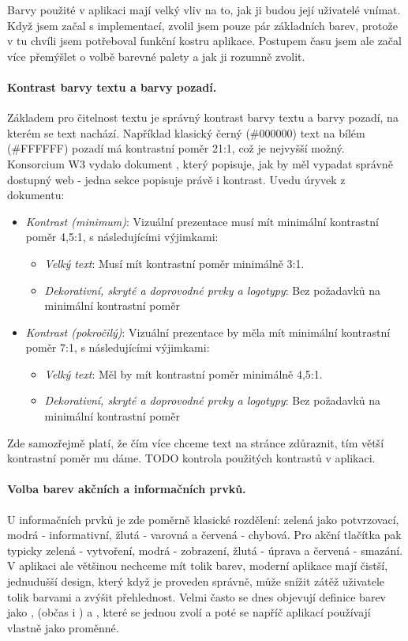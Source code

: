Barvy použité v aplikaci mají velký vliv na to, jak ji budou její uživatelé vnímat. Když jsem začal s implementací, zvolil jsem pouze pár základních barev, protože v tu chvíli jsem potřeboval funkční kostru aplikace. Postupem času jsem ale začal více přemýšlet o volbě barevné palety a jak ji rozumně zvolit.

\paragraph{Kontrast barvy textu a barvy pozadí.} Základem pro čitelnost textu je správný kontrast barvy textu a barvy pozadí, na kterém se text nachází. Například klasický černý (\#000000) text na bílém (\#FFFFFF) pozadí má kontrastní poměr 21:1, což je nejvyšší možný. Konsorcium W3 vydalo dokument \cite{w3-access-guide}, který popisuje, jak by měl vypadat správně dostupný web - jedna sekce popisuje právě i kontrast. Uvedu úryvek z dokumentu:
\begin{itemize}
    \item \emph{Kontrast (minimum)}: Vizuální prezentace musí mít minimální kontrastní poměr 4,5:1, s následujícími výjimkami:
    \begin{itemize}
        \item \emph{Velký text}: Musí mít kontrastní poměr minimálně 3:1.
        \item \emph{Dekorativní, skryté a doprovodné prvky a logotypy}: Bez požadavků na minimální kontrastní poměr
    \end{itemize}
    \item \emph{Kontrast (pokročilý)}: Vizuální prezentace by měla mít minimální kontrastní poměr 7:1, s následujícími výjimkami:
    \begin{itemize}
        \item \emph{Velký text}: Měl by mít kontrastní poměr minimálně 4,5:1.
        \item \emph{Dekorativní, skryté a doprovodné prvky a logotypy}: Bez požadavků na minimální kontrastní poměr
    \end{itemize}
\end{itemize}

Zde samozřejmě platí, že čím více chceme text na stránce zdůraznit, tím větší kontrastní poměr mu dáme. TODO kontrola použitých kontrastů v aplikaci.

\paragraph{Volba barev akčních a informačních prvků.} U informačních prvků je zde poměrně klasické rozdělení: zelená jako potvrzovací, modrá - informativní, žlutá - varovná a červená - chybová. Pro akční tlačítka pak typicky zelená - vytvoření, modrá - zobrazení, žlutá - úprava a červená - smazání. V aplikaci ale většinou nechceme mít tolik barev, moderní aplikace mají čistší, jednudušší design, který když je proveden správně, může snížit zátěž uživatele tolik barvami a zvýšit přehlednost. Velmi často se dnes objevují definice barev jako ,  (občas i ) a , které se jednou zvolí a poté se napříč aplikací používají vlastně jako proměnné.

